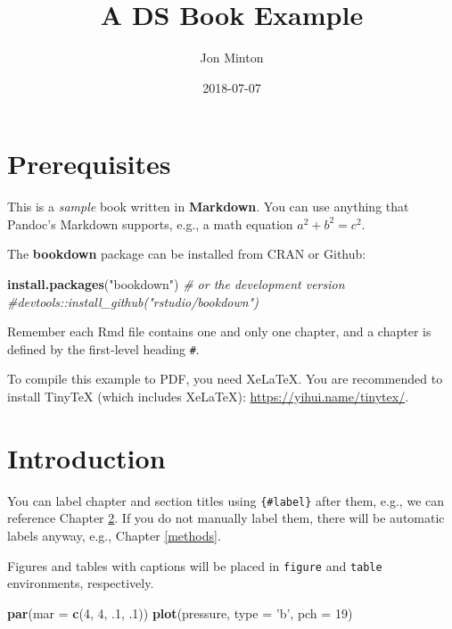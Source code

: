 \documentclass[]{book}
\title{A DS Book Example}
\author{Jon Minton}
\date{2018-07-07}
\newenvironment{Shaded}{\begin{snugshade}}{\end{snugshade}}
\newcommand{\KeywordTok}[1]{\textcolor[rgb]{0.13,0.29,0.53}{\textbf{#1}}}
\newcommand{\DataTypeTok}[1]{\textcolor[rgb]{0.13,0.29,0.53}{#1}}
\newcommand{\DecValTok}[1]{\textcolor[rgb]{0.00,0.00,0.81}{#1}}
\newcommand{\StringTok}[1]{\textcolor[rgb]{0.31,0.60,0.02}{#1}}
\newcommand{\CommentTok}[1]{\textcolor[rgb]{0.56,0.35,0.01}{\textit{#1}}}
\newcommand{\NormalTok}[1]{#1}
\theoremstyle{definition}
\theoremstyle{definition}
\theoremstyle{definition}
\theoremstyle{remark}
\begin{document}
\maketitle

{
\setcounter{tocdepth}{1}
\tableofcontents
}
\chapter{Prerequisites}\label{prerequisites}

This is a \emph{sample} book written in \textbf{Markdown}. You can use
anything that Pandoc's Markdown supports, e.g., a math equation
\(a^2 + b^2 = c^2\).

The \textbf{bookdown} package can be installed from CRAN or Github:

\begin{Shaded}
\begin{Highlighting}[]
\KeywordTok{install.packages}\NormalTok{(}\StringTok{"bookdown"}\NormalTok{)}
\CommentTok{# or the development version}
\CommentTok{#devtools::install_github("rstudio/bookdown")}
\end{Highlighting}
\end{Shaded}

Remember each Rmd file contains one and only one chapter, and a chapter
is defined by the first-level heading \texttt{\#}.

To compile this example to PDF, you need XeLaTeX. You are recommended to
install TinyTeX (which includes XeLaTeX):
\url{https://yihui.name/tinytex/}.

\chapter{Introduction}\label{intro}

You can label chapter and section titles using \texttt{\{\#label\}}
after them, e.g., we can reference Chapter \ref{intro}. If you do not
manually label them, there will be automatic labels anyway, e.g.,
Chapter \ref{methods}.

Figures and tables with captions will be placed in \texttt{figure} and
\texttt{table} environments, respectively.

\begin{Shaded}
\begin{Highlighting}[]
\KeywordTok{par}\NormalTok{(}\DataTypeTok{mar =} \KeywordTok{c}\NormalTok{(}\DecValTok{4}\NormalTok{, }\DecValTok{4}\NormalTok{, .}\DecValTok{1}\NormalTok{, .}\DecValTok{1}\NormalTok{))}
\KeywordTok{plot}\NormalTok{(pressure, }\DataTypeTok{type =} \StringTok{'b'}\NormalTok{, }\DataTypeTok{pch =} \DecValTok{19}\NormalTok{)}
\end{Highlighting}
\end{Shaded}
\end{document}
